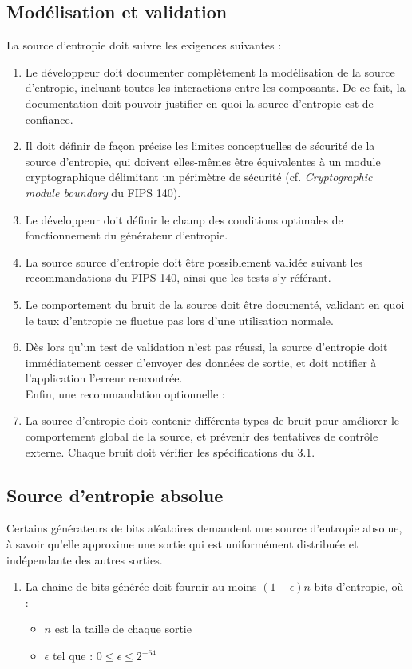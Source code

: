 \subsection{Modélisation et validation}
La source d'entropie doit suivre les exigences suivantes :
\begin{enumerate}
\item Le développeur doit documenter complètement la modélisation de la source d'entropie, incluant toutes les interactions entre les composants. De ce fait, la documentation doit pouvoir justifier en quoi la source d'entropie est de confiance. 
\item Il doit définir de façon précise les limites conceptuelles de sécurité de la source d'entropie, qui doivent elles-mêmes être équivalentes à un module cryptographique délimitant un périmètre de sécurité (cf. \textit{Cryptographic module boundary} du FIPS 140).
\item Le développeur doit définir le champ des conditions optimales de fonctionnement du générateur d'entropie.
\item La source source d'entropie doit être possiblement validée suivant les recommandations du FIPS 140, ainsi que les tests s'y référant.
\item Le comportement du bruit de la source doit être documenté, validant en quoi le taux d'entropie ne fluctue pas lors d'une utilisation normale.
\item Dès lors qu'un test de validation n'est pas réussi, la source d'entropie doit immédiatement cesser d'envoyer des données de sortie, et doit notifier à l'application l'erreur rencontrée.\\

Enfin, une recommandation optionnelle : 
\item La source d'entropie doit contenir différents types de bruit pour améliorer le comportement global de la source, et prévenir des tentatives de contrôle externe. Chaque bruit doit vérifier les spécifications du 3.1. 
\end{enumerate}

\subsection{Source d'entropie absolue}
Certains générateurs de bits aléatoires demandent une source d'entropie absolue, à savoir qu'elle approxime une sortie qui est uniformément distribuée et indépendante des autres sorties. 
\begin{enumerate}
\item La chaine de bits générée doit fournir au moins $(1-\epsilon)n$ bits d'entropie, où : 
	\begin{itemize}
	\item $n$ est la taille de chaque sortie
	\item $\epsilon$ tel que : $0\leqslant \epsilon \leqslant 2^{-64}$
	\end{itemize}
\end{enumerate}

